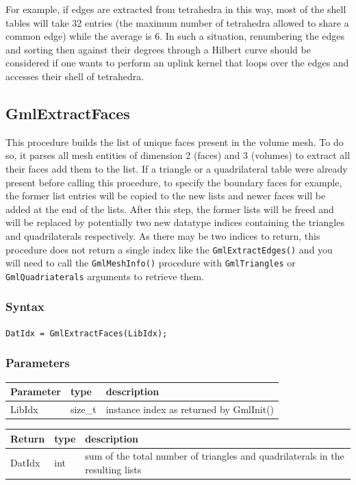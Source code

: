 \documentclass[a4paper,12pt]{article}
\begin{document}
For example, if edges are extracted from tetrahedra in this way, most of the shell tables will take 32 entries (the maximum number of tetrahedra allowed to share a common edge) while the average is 6. In such a situation, renumbering the edges and sorting then against their degrees through a Hilbert curve should be considered if one wants to perform an uplink kernel that loops over the edges and accesses their shell of tetrahedra.


\subsection{GmlExtractFaces}
This procedure builds the list of unique faces present in the volume mesh. To do so, it parses all mesh entities of dimension 2 (faces) and 3 (volumes) to extract all their faces add them to the list. If a triangle or a quadrilateral table were already present before calling this procedure, to specify the boundary faces for example, the former list entries will be copied to the new lists and newer faces will be added at the end of the lists. After this step, the former lists will be freed and will be replaced by potentially two new datatype indices containing the triangles and quadrilaterals respectively. As there may be two indices to return, this procedure does not return a single index like the {\tt GmlExtractEdges()} and you will need to call the {\tt GmlMeshInfo()} procedure with {\tt GmlTriangles} or {\tt GmlQuadriaterals} arguments to retrieve them.

\subsubsection*{Syntax}
{\tt DatIdx = GmlExtractFaces(LibIdx);}

\subsubsection*{Parameters}
\begin{tabular}{|m{2cm}|m{1.5cm}|m{10.5cm}|}
\hline
Parameter  & type    & description \\
\hline
LibIdx     & size\_t & instance index as returned by GmlInit() \\
\hline
\end{tabular}

\medskip

\begin{tabular}{|m{2cm}|m{1.5cm}|m{10.5cm}|}
\hline
Return     & type   & description \\
\hline
DatIdx     & int    & sum of the total number of triangles and quadrilaterals in the resulting lists \\
\hline
\end{tabular}
\end{document}
